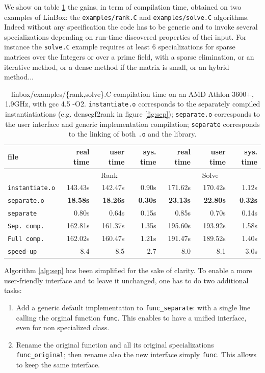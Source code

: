 \documentclass[runningheads,a4paper]{llncs}
\newcommand{\linbox}{{\sc LinBox}}
\begin{document}
We show on table \ref{tab:compilation} the gains, in term of compilation time,
obtained on two examples of \linbox: the \texttt{examples/rank.C} and
\texttt{examples/solve.C} algorithms. Indeed without any specification
the code
has to be generic and to invoke several specializations depending on
run-time discovered properties of thei input. For instance the
\texttt{solve.C} example requires at least 6 specializations for sparse
matrices over the Integers or over a prime field, with a sparse
elimination, or an iterative method, or a dense method if the matrix
is small, or an hybrid method...\\ 
\begin{table}[ht]\center
\begin{tabular}{|l||r|r|r||r|r|r|}
\hline
file                      &  real time   &  user time   &  sys. time  &  real time   &  user time   &  sys. time \\
\hline
 & \multicolumn{3}{|c||}{Rank}& \multicolumn{3}{|c|}{Solve}\\
\hline
\texttt{instantiate.o} & 143.43s & 142.47s & 0.90s & 171.62s & 170.42s & 1.12s\\
\texttt{separate.o} & \bf 18.58s & \bf 18.26s & \bf 0.30s & \bf 23.13s & \bf 22.80s & \bf 0.32s\\
\texttt{separate} & 0.80s & 0.64s & 0.15s & 0.85s & 0.70s & 0.14s\\
\hline
\texttt{Sep. comp.} & 162.81s & 161.37s & 1.35s & 195.60s & 193.92s & 1.58s\\
\hline
\texttt{Full comp.} & 162.02s & 160.47s & 1.21s & 191.47s & 189.52s & 1.40s\\
\hline
\hline
\texttt{speed-up} & 8.4 & 8.5 & 2.7 & 8.0 & 8.1 & 3.0s\\
\hline
\end{tabular} 
\caption{linbox/examples/\{rank,solve\}.C compilation time on an AMD
  Athlon 3600+, 1.9GHz, with gcc 4.5 -O2. \texttt{instantiate.o} corresponds to the separately compiled
  instantiatiations (e.g. densegf2rank in figure \ref{fig:sep});
  \texttt{separate.o} corresponds to the user interface and generic
  implementation compilation; \texttt{separate} corresponds to the
  linking of both \texttt{.o} and the library.}\label{tab:compilation}
\end{table}

\begin{remark} Algorithm \ref{alg:sep} has been simplified for the
  sake of clarity. To enable a more user-friendly interface and to
  leave it unchanged, one has to do two additional tasks:
\begin{enumerate}
\item Add a generic default implementation to \texttt{func\_separate}:
 with a single line calling the orginal function \texttt{func}. This
 enables to have a unified interface, even for non specialized class.
\item Rename the original function and all its
  original specializations \texttt{func\_original}; then rename also
  the new interface simply \texttt{func}. This allows to keep the same
  interface.
\end{enumerate}
\end{remark}
\end{document}
